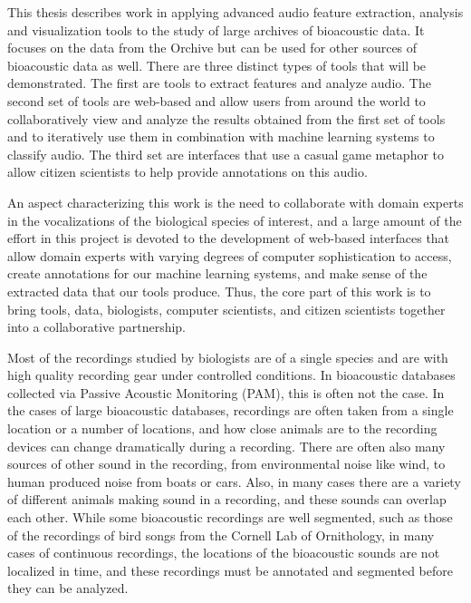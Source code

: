 This thesis describes work in applying advanced audio feature
extraction, analysis and visualization tools to the study of large
archives of bioacoustic data.  It focuses on the data from the Orchive
but can be used for other sources of bioacoustic data as well.  There
are three distinct types of tools that will be demonstrated.  The
first are tools to extract features and analyze audio.  The second set
of tools are web-based and allow users from around the world to
collaboratively view and analyze the results obtained from the first
set of tools and to iteratively use them in combination with machine
learning systems to classify audio.  The third set are interfaces that
use a casual game metaphor to allow citizen scientists to help provide
annotations on this audio.

An aspect characterizing this work is the need to collaborate with
domain experts in the vocalizations of the biological species of
interest, and a large amount of the effort in this project is devoted
to the development of web-based interfaces that allow domain experts
with varying degrees of computer sophistication to access, create
annotations for our machine learning systems, and make sense of the
extracted data that our tools produce.  Thus, the core part of this
work is to bring tools, data, biologists, computer scientists, and
citizen scientists together into a collaborative partnership.

Most of the recordings studied by biologists are of a single species
and are with high quality recording gear under controlled conditions.
In bioacoustic databases collected via Passive Acoustic Monitoring
(PAM), this is often not the case.  In the cases of large bioacoustic
databases, recordings are often taken from a single location or a
number of locations, and how close animals are to the recording
devices can change dramatically during a recording.  There are often
also many sources of other sound in the recording, from environmental
noise like wind, to human produced noise from boats or
cars. Also, in many cases there are a variety of different animals
making sound in a recording, and these sounds can overlap each other.
While some bioacoustic recordings are well segmented, such as those of
the recordings of bird songs from the Cornell Lab of Ornithology, in
many cases of continuous recordings, the locations of the bioacoustic
sounds are not localized in time, and these recordings must be
annotated and segmented before they can be analyzed.

